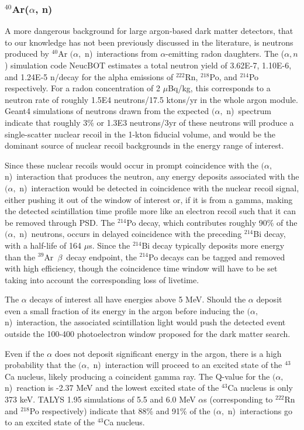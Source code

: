 \documentclass[a4paper,11pt]{article}
\newcommand{\artn}{$^{39}$Ar}
\newcommand{\alphan}{$(\alpha,$ n)}
\begin{document}
\subsubsection{$^{40}$Ar($\alpha$, n)}
A more dangerous background for large argon-based dark matter detectors, that to our knowledge has not been previously discussed in the literature, is neutrons produced by $^{40}$Ar \alphan~interactions from $\alpha$-emitting radon daughters. The ($\alpha,n$) simulation code NeucBOT \cite{westerdale2017radiogenic} estimates a total neutron yield of \num{3.62E-7}, \num{1.10E-6}, and \num{1.24E-5} n/decay for the alpha emissions of $^{222}$Rn, $^{218}$Po, and $^{214}$Po respectively. For a radon concentration of 2 $\mu$Bq/kg, this corresponds to a neutron rate of roughly \num{1.5E4} neutrons/17.5 ktons/yr in the whole argon module. Geant4 simulations of neutrons drawn from the expected \alphan~spectrum indicate that roughly 3\% or \num{1.3E3} neutrons/3yr of these neutrons will produce a single-scatter nuclear recoil in the 1-kton fiducial volume, and would be the dominant source of nuclear recoil backgrounds in the energy range of interest.

Since these nuclear recoils would occur in prompt coincidence with the \alphan~interaction that produces the neutron, any energy deposits associated with the \alphan~interaction would be detected in coincidence with the nuclear recoil signal, either pushing it out of the window of interest or, if it is from a gamma, making the detected scintillation time profile more like an electron recoil such that it can be removed through PSD. 
The $^{214}$Po decay, which contributes roughly 90\% of the \alphan~neutrons, occurs in delayed coincidence with the preceding $^{214}$Bi decay, with a half-life of 164 $\mu$s. Since the $^{214}$Bi decay typically deposits more energy than the \artn~$\beta$~decay endpoint, the $^{214}$Po decays can be tagged and removed with high efficiency, though the coincidence time window will have to be set taking into account the corresponding loss of livetime.

The $\alpha$ decays of interest all have energies above 5 MeV. Should the $\alpha$ deposit even a small fraction of its energy in the argon before inducing the \alphan~interaction, the associated scintillation light would push the detected event outside the 100-400 photoelectron window proposed for the dark matter search. 

Even if the $\alpha$ does not deposit significant energy in the argon, there is a high probability that the \alphan~interaction will proceed to an excited state of the $^{43}$Ca nucleus, likely producing a coincident gamma ray. The Q-value for the \alphan~reaction is -2.37 MeV and the lowest excited state of the $^{43}$Ca nucleus is only 373 keV. TALYS 1.95 \cite{koning2007talys} simulations of 5.5 and 6.0 MeV $\alpha$s (corresponding to $^{222}$Rn and $^{218}$Po respectively) indicate that 88\% and 91\% of the \alphan~interactions go to an excited state of the $^{43}$Ca nucleus. 
\end{document}
